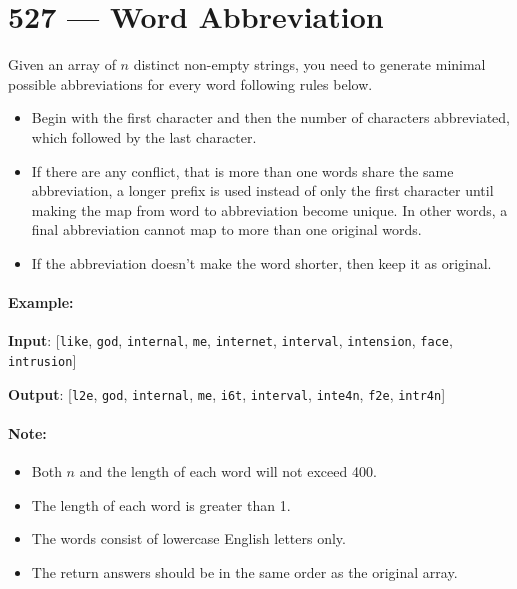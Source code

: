 \section{527 --- Word Abbreviation}
Given an array of $n$ distinct non-empty strings, you need to generate minimal possible abbreviations for every word following rules below.

\begin{itemize}
\item Begin with the first character and then the number of characters abbreviated, which followed by the last character.
\item If there are any conflict, that is more than one words share the same abbreviation, a longer prefix is used instead of only the first character until making the map from word to abbreviation become unique. In other words, a final abbreviation cannot map to more than one original words.
\item If the abbreviation doesn't make the word shorter, then keep it as original.
\end{itemize}

\paragraph{Example:}

\begin{flushleft}
\textbf{Input}: [\texttt{like}, \texttt{god}, \texttt{internal}, \texttt{me}, \texttt{internet}, \texttt{interval}, \texttt{intension}, \texttt{face}, \texttt{intrusion}]

\textbf{Output}: [\texttt{l2e}, \texttt{god}, \texttt{internal}, \texttt{me}, \texttt{i6t}, \texttt{interval}, \texttt{inte4n}, \texttt{f2e}, \texttt{intr4n}]
\end{flushleft}

\paragraph{Note:}

\begin{itemize}
\item Both $ n $ and the length of each word will not exceed 400.
\item The length of each word is greater than 1.
\item The words consist of lowercase English letters only.
\item The return answers should be in the same order as the original array.
\end{itemize}
